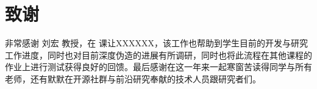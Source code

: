 \chapter{致谢}

非常感谢 刘宏 教授，在  课让XXXXXX，该工作也帮助到学生目前的开发与研究工作进度，同时也对目前深度伪造的进展有所调研，同时也将此流程在其他课程的作业上进行测试获得良好的回馈。最后感谢在这一年来一起寒窗苦读得同学与所有老师，还有默默在开源社群与前沿研究奉献的技术人员跟研究者们。